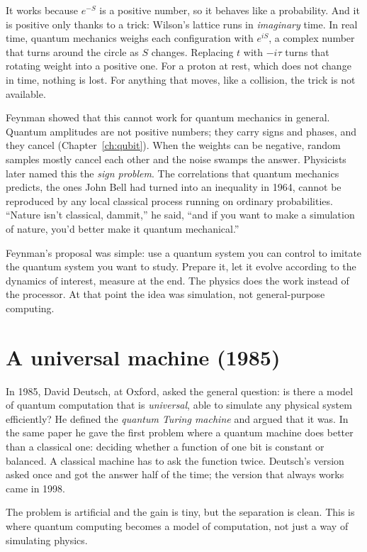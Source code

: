 It works because $e^{-S}$ is a positive number, so it behaves like a probability.
And it is positive only thanks to a trick: Wilson's lattice runs in \emph{imaginary}
time. In real time, quantum mechanics weighs each configuration with $e^{iS}$, a
complex number that turns around the circle as $S$ changes. Replacing $t$ with $-i\tau$
turns that rotating weight into a positive one. For a proton at rest, which does not
change in time, nothing is lost. For anything that moves, like a collision, the
trick is not available.

Feynman showed that this cannot work for quantum mechanics in general. Quantum
amplitudes are not positive numbers; they carry signs and phases, and they cancel
(Chapter~\ref{ch:qubit}). When the weights can be negative, random samples mostly
cancel each other and the noise swamps the answer. Physicists later named this the
\emph{sign problem}. The correlations that quantum mechanics predicts, the ones John
Bell had turned into an inequality in 1964, cannot be reproduced by any local
classical process running on ordinary probabilities. ``Nature isn't classical, dammit,'' he
said, ``and if you want to make a simulation of nature, you'd better make it quantum
mechanical.''

Feynman's proposal was simple: use a quantum system you can control to imitate
the quantum system you want to study. Prepare it, let it evolve according to the
dynamics of interest, measure at the end. The physics does the work instead of
the processor. At that point the idea was simulation, not general-purpose
computing.

\section{A universal machine (1985)}

In 1985, David Deutsch, at Oxford, asked the general question: is there a model
of quantum computation that is \emph{universal}, able to simulate any physical
system efficiently? He defined the \emph{quantum Turing machine} and argued that
it was. In the same paper he gave the first problem where a quantum machine does
better than a classical one: deciding whether a function of one bit is constant
or balanced. A classical machine has to ask the function twice. Deutsch's
version asked once and got the answer half of the time; the version that always
works came in 1998.

The problem is artificial and the gain is tiny, but the separation is clean. This
is where quantum computing becomes a model of computation, not just a way of
simulating physics.

